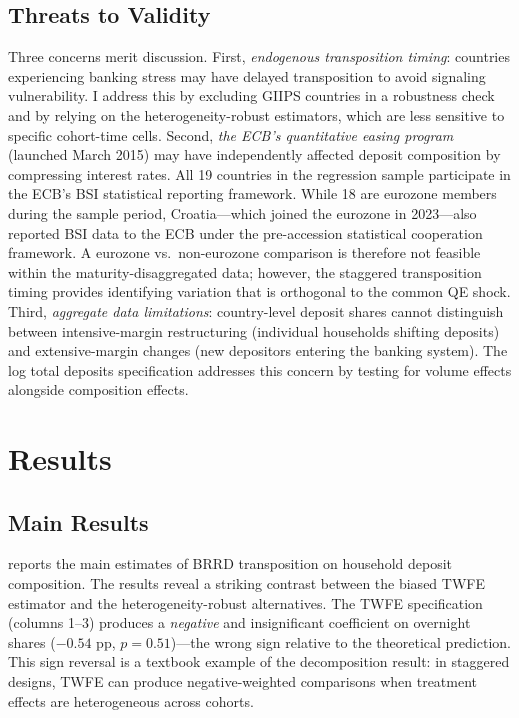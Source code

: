 \documentclass[12pt]{article}
\begin{document}
\subsection{Threats to Validity}

Three concerns merit discussion. First, \textit{endogenous transposition timing}: countries experiencing banking stress may have delayed transposition to avoid signaling vulnerability. I address this by excluding GIIPS countries in a robustness check and by relying on the heterogeneity-robust estimators, which are less sensitive to specific cohort-time cells. Second, \textit{the ECB's quantitative easing program} (launched March 2015) may have independently affected deposit composition by compressing interest rates. All 19 countries in the regression sample participate in the ECB's BSI statistical reporting framework. While 18 are eurozone members during the sample period, Croatia---which joined the eurozone in 2023---also reported BSI data to the ECB under the pre-accession statistical cooperation framework. A eurozone vs.\ non-eurozone comparison is therefore not feasible within the maturity-disaggregated data; however, the staggered transposition timing provides identifying variation that is orthogonal to the common QE shock. Third, \textit{aggregate data limitations}: country-level deposit shares cannot distinguish between intensive-margin restructuring (individual households shifting deposits) and extensive-margin changes (new depositors entering the banking system). The log total deposits specification addresses this concern by testing for volume effects alongside composition effects.


\section{Results}

\subsection{Main Results}

 reports the main estimates of BRRD transposition on household deposit composition. The results reveal a striking contrast between the biased TWFE estimator and the heterogeneity-robust alternatives. The TWFE specification (columns 1--3) produces a \textit{negative} and insignificant coefficient on overnight shares ($-0.54$ pp, $p = 0.51$)---the wrong sign relative to the theoretical prediction. This sign reversal is a textbook example of the \citet{goodman2021difference} decomposition result: in staggered designs, TWFE can produce negative-weighted comparisons when treatment effects are heterogeneous across cohorts.
\end{document}
